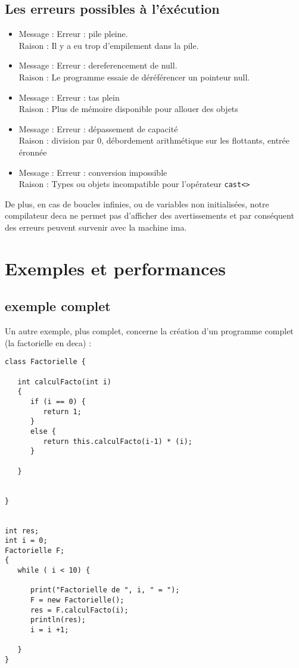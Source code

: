 \documentclass[11pt]{article}
\begin{document}
   \subsection{Les erreurs possibles à l'éxécution}
   \begin{itemize}
   \item Message : Erreur : pile pleine. \\
         Raison : Il y a eu trop d'empilement dans la pile.
   \item Message : Erreur : dereferencement de null. \\
         Raison : Le programme essaie de déréférencer un pointeur null.
   \item Message : Erreur : tas plein \\
         Raison : Plus de mémoire disponible pour allouer des objets
   \item Message : Erreur : dépassement de capacité  \\
         Raison : division par 0, débordement arithmétique sur les flottants, entrée éronnée
   \item Message : Erreur : conversion impossible \\
         Raison : Types ou objets incompatible pour l'opérateur \verb!cast<>!
   \end{itemize}
   
   De plus, en cas de boucles infinies, ou de variables non initialisées, notre compilateur deca ne permet pas d'afficher des avertissements et par conséquent des erreurs peuvent survenir avec la machine ima.

   \newpage

   \section{Exemples et performances}
   
\subsection{exemple complet}
   Un autre exemple, plus complet, concerne la création d'un programme complet (la factorielle en deca) :
    \begin{lstlisting}
class Factorielle {
  
   int calculFacto(int i)
   {
      if (i == 0) {
         return 1;
      }
      else {
         return this.calculFacto(i-1) * (i);
      }
   
   }


}


int res;
int i = 0;
Factorielle F;
{
   while ( i < 10) {

      print("Factorielle de ", i, " = ");
      F = new Factorielle();
      res = F.calculFacto(i); 
      println(res);
      i = i +1;
       
   }
}

    \end{lstlisting}
\end{document}
